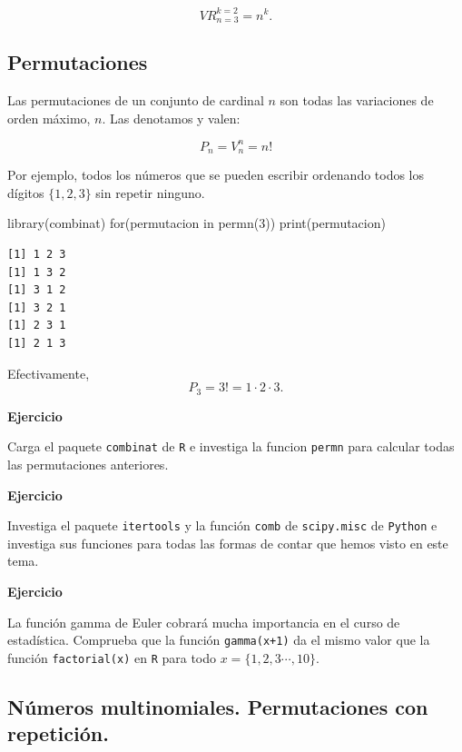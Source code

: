 \documentclass[
  letterpaper,
  DIV=11,
  numbers=noendperiod]{scrreprt}
\newenvironment{Shaded}{\begin{snugshade}}{\end{snugshade}}
\newcommand{\ControlFlowTok}[1]{\textcolor[rgb]{0.00,0.23,0.31}{#1}}
\newcommand{\DecValTok}[1]{\textcolor[rgb]{0.68,0.00,0.00}{#1}}
\newcommand{\FunctionTok}[1]{\textcolor[rgb]{0.28,0.35,0.67}{#1}}
\newcommand{\NormalTok}[1]{\textcolor[rgb]{0.00,0.23,0.31}{#1}}
\begin{document}
\[
VR^{k=2}_{n=3}=n^k.
\]

\hypertarget{permutaciones}{%
\subsection{Permutaciones}\label{permutaciones}}

Las permutaciones de un conjunto de cardinal \(n\) son todas las
variaciones de orden máximo, \(n\). Las denotamos y valen:

\[
P_n=V_n^n=n!
\]

Por ejemplo, todos los números que se pueden escribir ordenando todos
los dígitos \(\{1,2,3\}\) sin repetir ninguno.

\begin{Shaded}
\begin{Highlighting}[]
\FunctionTok{library}\NormalTok{(combinat)}
\ControlFlowTok{for}\NormalTok{(permutacion }\ControlFlowTok{in} \FunctionTok{permn}\NormalTok{(}\DecValTok{3}\NormalTok{)) }\FunctionTok{print}\NormalTok{(permutacion)}
\end{Highlighting}
\end{Shaded}

\begin{verbatim}
[1] 1 2 3
[1] 1 3 2
[1] 3 1 2
[1] 3 2 1
[1] 2 3 1
[1] 2 1 3
\end{verbatim}

Efectivamente, \[
P_3=3!=1\cdot  2\cdot 3.
\]

\textbf{Ejercicio}

Carga el paquete \texttt{combinat} de \texttt{R} e investiga la funcion
\texttt{permn} para calcular todas las permutaciones anteriores.

\textbf{Ejercicio}

Investiga el paquete \texttt{itertools} y la función \texttt{comb} de
\texttt{scipy.misc} de \texttt{Python} e investiga sus funciones para
todas las formas de contar que hemos visto en este tema.

\textbf{Ejercicio}

La función gamma de Euler cobrará mucha importancia en el curso de
estadística. Comprueba que la función \texttt{gamma(x+1)} da el mismo
valor que la función \texttt{factorial(x)} en \texttt{R} para todo
\(x = \{1,2,3\cdots,10\}\).

\hypertarget{nuxfameros-multinomiales.-permutaciones-con-repeticiuxf3n.}{%
\subsection{Números multinomiales. Permutaciones con
repetición.}\label{nuxfameros-multinomiales.-permutaciones-con-repeticiuxf3n.}}
\end{document}
